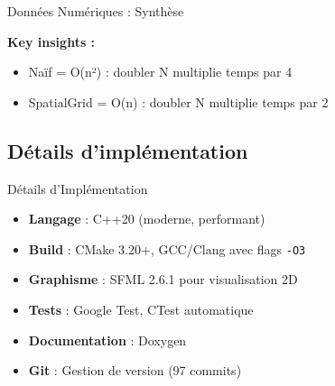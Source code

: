 \documentclass[aspectratio=169]{beamer}
\begin{document}

\begin{frame}{Données Numériques : Synthèse}

\begin{table}[h]
\centering
{}
\end{table}

\vspace{0.5cm}

\textbf{Key insights :}
\begin{itemize}
    \item Naïf = O(n²) : doubler N multiplie temps par 4
    \item SpatialGrid = O(n) : doubler N multiplie temps par 2
\end{itemize}

\end{frame}

\subsection{Détails d'implémentation}
\begin{frame}{Détails d'Implémentation}
\begin{itemize}
    \setlength\itemsep{0.8em}
    \item \textbf{Langage} : C++20 (moderne, performant)
    \item \textbf{Build} : CMake 3.20+, GCC/Clang avec flags \texttt{-O3}
    \item \textbf{Graphisme} : SFML 2.6.1 pour visualisation 2D
    \item \textbf{Tests} : Google Test, CTest automatique
    \item \textbf{Documentation} : Doxygen
    \item \textbf{Git} : Gestion de version (97 commits)
\end{itemize}
\end{frame}
\end{document}
